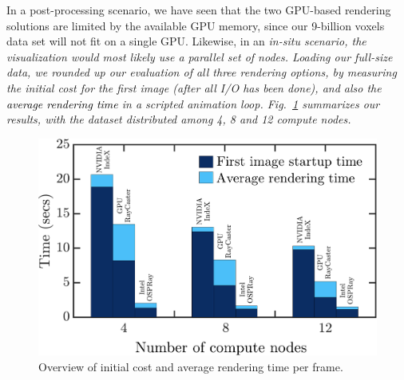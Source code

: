 \documentclass[5p,times]{elsarticle}
\begin{document}
In a post-processing scenario, we have seen that the two GPU-based
rendering solutions are limited by the available GPU memory, since our 9-billion
voxels data set will not fit on a single GPU. Likewise, in an \it{in-situ} \rm
scenario, the visualization would most likely use a parallel 
set of nodes. Loading our full-size data, we rounded up our evaluation of all
three rendering options, by measuring the initial cost
for the first image (after all I/O has been done), and also the \textcolor{black}{average rendering time}
in a scripted animation loop. Fig.~\ref{fig:diagram} summarizes our results,
with the dataset distributed among 4, 8 and 12 compute nodes.


\begin{figure}
	\centering
	\includegraphics[width=\linewidth]{bardiagram}%
	\caption{\label{fig:diagram} Overview of initial cost and average rendering time per frame.}
\end{figure}
\end{document}
